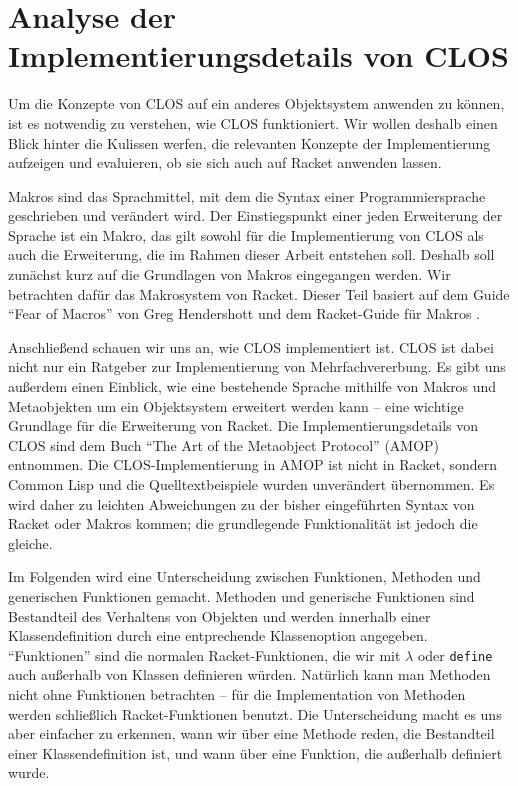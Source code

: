\chapter{Analyse der Implementierungsdetails von CLOS}
Um die Konzepte von CLOS auf ein anderes Objektsystem anwenden zu können, ist es notwendig zu verstehen, wie CLOS funktioniert. Wir wollen deshalb einen Blick hinter die Kulissen werfen, die relevanten Konzepte der Implementierung aufzeigen und evaluieren, ob sie sich auch auf Racket anwenden lassen.

Makros sind das Sprachmittel, mit dem die Syntax einer Programmiersprache geschrieben und verändert wird. Der Einstiegspunkt einer jeden Erweiterung der Sprache ist ein Makro, das gilt sowohl für die Implementierung von CLOS als auch die Erweiterung, die im Rahmen dieser Arbeit entstehen soll. Deshalb soll zunächst kurz auf die Grundlagen von Makros eingegangen werden. Wir betrachten dafür das Makrosystem von Racket. Dieser Teil basiert auf dem Guide ``Fear of Macros'' von Greg Hendershott \cite{fearofmacros} und dem Racket-Guide für Makros \cite{racketguide-macros}.

Anschließend schauen wir uns an, wie CLOS implementiert ist. CLOS ist dabei nicht nur ein Ratgeber zur Implementierung von Mehrfachvererbung. Es gibt uns außerdem einen Einblick, wie eine bestehende Sprache mithilfe von Makros und Metaobjekten um ein Objektsystem erweitert werden kann -- eine wichtige Grundlage für die Erweiterung von Racket. Die Implementierungsdetails von CLOS sind dem Buch ``The Art of the Metaobject Protocol'' (AMOP) \cite{amop} entnommen. Die CLOS-Implementierung in AMOP ist nicht in Racket, sondern Common Lisp und die Quelltextbeispiele wurden unverändert übernommen. Es wird daher zu leichten Abweichungen zu der bisher eingeführten Syntax von Racket oder Makros kommen; die grundlegende Funktionalität ist jedoch die gleiche.

Im Folgenden wird eine Unterscheidung zwischen Funktionen, Methoden und generischen Funktionen gemacht. Methoden und generische Funktionen sind Bestandteil des Verhaltens von Objekten und werden innerhalb einer Klassendefinition durch eine entprechende Klassenoption angegeben. ``Funktionen'' sind die normalen Racket-Funktionen, die wir mit \texttt{$\lambda$} oder \texttt{define} auch außerhalb von Klassen definieren würden. Natürlich kann man Methoden nicht ohne Funktionen betrachten -- für die Implementation von Methoden werden schließlich Racket-Funktionen benutzt. Die Unterscheidung macht es uns aber einfacher zu erkennen, wann wir über eine Methode reden, die Bestandteil einer Klassendefinition ist, und wann über eine Funktion, die außerhalb definiert wurde.

